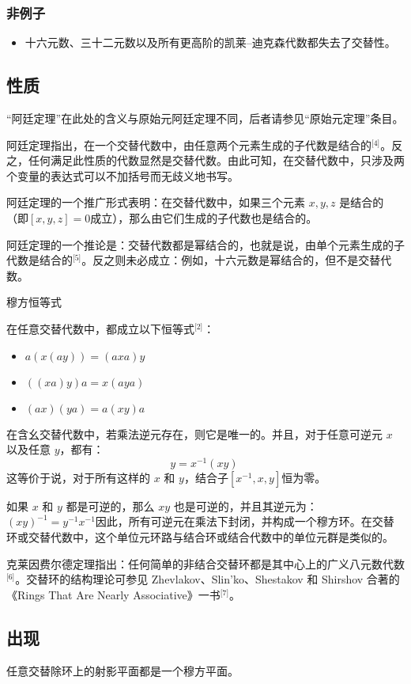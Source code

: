 \subsubsection{非例子}
\begin{itemize}
\item 十六元数、三十二元数以及所有更高阶的凯莱–迪克森代数都失去了交替性。
\end{itemize}
\subsection{性质}
“阿廷定理”在此处的含义与原始元阿廷定理不同，后者请参见“原始元定理”条目。

阿廷定理指出，在一个交替代数中，由任意两个元素生成的子代数是结合的\(^\text{[4]}\)。反之，任何满足此性质的代数显然是交替代数。由此可知，在交替代数中，只涉及两个变量的表达式可以不加括号而无歧义地书写。

阿廷定理的一个推广形式表明：在交替代数中，如果三个元素 $x, y, z$ 是结合的（即$
[x, y, z] = 0$成立），那么由它们生成的子代数也是结合的。

阿廷定理的一个推论是：交替代数都是幂结合的，也就是说，由单个元素生成的子代数是结合的\(^\text{[5]}\)。反之则未必成立：例如，十六元数是幂结合的，但不是交替代数。

穆方恒等式

在任意交替代数中，都成立以下恒等式\(^\text{[2]}\)：
\begin{itemize}
\item $a(x(ay)) = (axa)y$
\item $((xa)y)a = x(aya)$
\item $(ax)(ya) = a(xy)a$
\end{itemize}
在含幺交替代数中，若乘法逆元存在，则它是唯一的。并且，对于任意可逆元 $x$ 以及任意 $y$，都有：
$$
y = x^{-1}(xy)~
$$
这等价于说，对于所有这样的 $x$ 和 $y$，结合子$[x^{-1}, x, y]$恒为零。

如果 $x$ 和 $y$ 都是可逆的，那么 $xy$ 也是可逆的，并且其逆元为：$(xy)^{-1} = y^{-1}x^{-1}$因此，所有可逆元在乘法下封闭，并构成一个穆方环。在交替环或交替代数中，这个单位元环路与结合环或结合代数中的单位元群是类似的。

克莱因费尔德定理指出：任何简单的非结合交替环都是其中心上的广义八元数代数\(^\text{[6]}\)。交替环的结构理论可参见 Zhevlakov、Slin'ko、Shestakov 和 Shirshov 合著的《Rings That Are Nearly Associative》一书\(^\text{[7]}\)。
\subsection{出现}
任意交替除环上的射影平面都是一个穆方平面。

